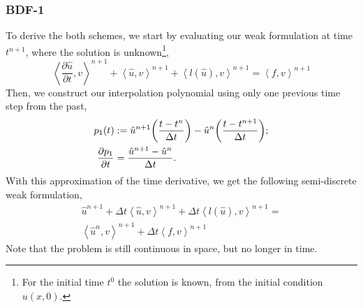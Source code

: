 \documentclass[../../thesis.tex]{subfiles}
\newcommand{\inner}[2]{\left<#1, #2\right>}
\newcommand{\dt}{\ensuremath{\Delta t}}
\begin{document}
\subsubsection{BDF-1}
To derive the both schemes, 
we start by evaluating our weak formulation at time $t^{n+1}$, 
where the solution is unknown\footnote{
    For the initial time $t^0$ the solution is known, from the initial condition
    $u(x,0)$.
},
\begin{equation}
    \inner{\frac{\partial \hat{u}}{\partial t}}{v}^{n+1}
    + \inner{\hat{u}}{v}^{n+1}
    + \inner{l(\hat{u})}{v}^{n+1}
    =  
    \inner{f}{v}^{n+1}
\end{equation}
Then, we construct our interpolation polynomial using only one previous time step from the past, 
\begin{subequations}
\begin{align}
        p_1(t) 
        &:= 
        \hat{u}^{n+1}
        \qty(\frac{t-t^{n}}{\dt})
        - 
        \hat{u}^{n}
        \qty(\frac{t-t^{n+1}}{\dt});
        \\
        \pdv{p_1}{t} 
        &= 
        \frac{\hat{u}^{n+1} - \hat{u}^{n}}{\dt}.
    \end{align}
\end{subequations}
With this approximation of the time derivative, we get the following semi-discrete weak formulation,
\begin{align}
    \hat{u}^{n+1}
    + \dt \inner{\hat{u}}{v}^{n+1}
    + \dt \inner{l(\hat{u})}{v}^{n+1}
    =
    \nonumber \\
    \inner{\hat{u}^{n}}{v}^{n+1}
    + 
    \dt \inner{f}{v}^{n+1}
    \label{eq:bdf_1_toy_weak_formulation}
\end{align}
Note that the problem is still continuous in space, but no longer in time.
\end{document}
